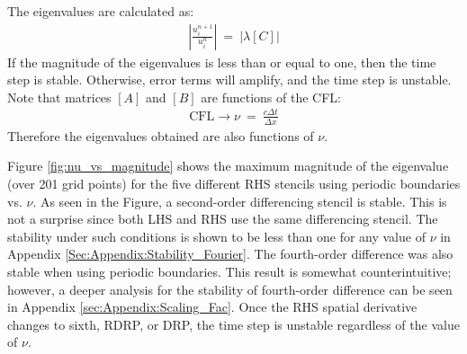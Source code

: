 \documentclass[conf]{new-aiaa}
\begin{document}
The eigenvalues are calculated as:
\begin{equation}
	\begin{split}
		\label{eq:Magnitude_Of_Eigen}
  			\left|\frac{u_i^{n+1}}{u_i^{n}}\right|~=~\left|\lambda\left[C\right]\right|
	\end{split}
\end{equation}
If the magnitude of the eigenvalues is less than or equal to one, then the time step is stable.  
Otherwise, error terms will amplify, and the time step is unstable.
Note that matrices $[A]$ and $[B]$ are functions of the CFL:
\begin{equation}
	\begin{split}
		\label{eq:CFL}
  			\text{CFL}\to\nu~=~\frac{c\Delta{t}}{\Delta{x}}
	\end{split}
\end{equation}
Therefore the eigenvalues obtained are also functions of $\nu$. 

Figure \ref{fig:nu_vs_magnitude} shows the maximum magnitude of the eigenvalue (over 201 grid points) for the five different RHS stencils using periodic boundaries vs. $\nu$. 
As seen in the Figure, a second-order differencing stencil is stable. 
This is not a surprise since both LHS and RHS use the same differencing stencil. 
The stability under such conditions is shown to be less than one for any value of $\nu$ in Appendix \ref{Sec:Appendix:Stability_Fourier}.
The fourth-order difference was also stable when using periodic boundaries. 
This result is somewhat counterintuitive; however, a deeper analysis for the stability of fourth-order difference can be seen in Appendix \ref{sec:Appendix:Scaling_Fac}. 
Once the RHS spatial derivative changes to sixth, RDRP, or DRP, the time step is unstable regardless of the value of $\nu$. 
\end{document}
